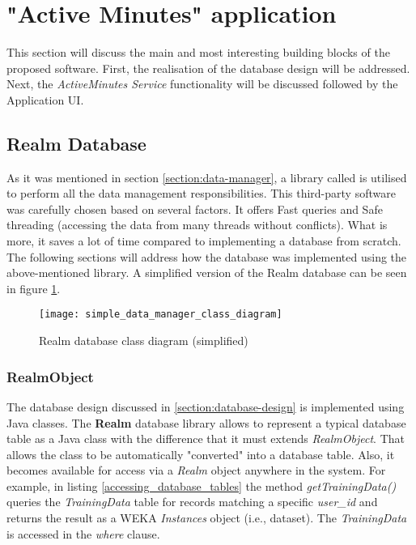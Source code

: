 \section{"Active Minutes" application} 
This section will discuss the main and most interesting building blocks of the proposed software. First, the realisation of the database design will be addressed. Next, the \textit{ActiveMinutes Service} functionality will be discussed followed by the Application UI.  
    
    \subsection{Realm Database}
    As it was mentioned in section \ref{section:data-manager}, a library called \citet{realmdatabase_2017} is utilised to perform all the data management responsibilities. This third-party software was carefully chosen based on several factors. It offers Fast queries and Safe threading (accessing the data from many threads without conflicts). What is more, it saves a lot of time compared to implementing a database from scratch. The following sections will address how the database was implemented using the above-mentioned library. A simplified version of the Realm database can be seen in figure \ref{fig:realm_database}. 
    
    \begin{figure}[ht]
    \centering
    \texttt{[image: simple\_data\_manager\_class\_diagram]}
    \caption{Realm database class diagram (simplified)}
    \label{fig:realm_database}
    \end{figure}
    
    \subsubsection{RealmObject}
     The database design discussed in \ref{section:database-design} is implemented using Java classes. The \textbf{Realm} database library allows to represent a typical database table as a Java class with the difference that it must extends \textit{RealmObject}. That allows the class to be automatically "converted" into a database table. Also, it becomes available for access via a \textit{Realm} object anywhere in the system. For example, in listing \ref{accessing_database_tables} the method \textit{getTrainingData()} queries the \textit{TrainingData} table for records matching a specific \textit{user\_id} and returns the result as a WEKA \textit{Instances} object (i.e., dataset). The \textit{TrainingData} is accessed in the \textit{where} clause.
     
